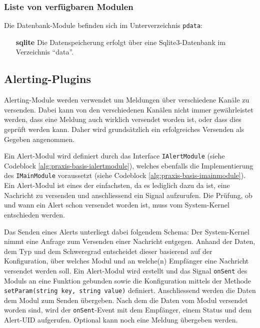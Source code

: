 \subsubsection{Liste von verf\"ugbaren Modulen} \label{sec:praxis-basis-data-list}
Die Datenbank-Module befinden sich im Unterverzeichnis \texttt{pdata}:
\begin{itemize}
 \item[\textbf{sqlite}] Die Datenspeicherung erfolgt \"uber eine Sqlite3-Datenbank im Verzeichnis "`data"'.
\end{itemize}

\subsection{Alerting-Plugins} \label{sec:praxis-basis-alert}
Alerting-Module werden verwendet um Meldungen \"uber verschiedene Kan\"ale zu versenden. Dabei kann von den verschiedenen Kan\"alen nicht immer gew\"ahrleistet werden, dass eine Meldung auch wirklich versendet worden ist, oder dass dies gepr\"uft werden kann. Daher wird grunds\"atzlich ein erfolgreiches Versenden als Gegeben angenommen.

Ein Alert-Modul wird definiert durch das Interface \texttt{IAlertModule} (siehe Codeblock \ref{alg:praxis-basis-ialertmodule}), welches ebenfalls die Implementierung des \texttt{IMainModule} voraussetzt (siehe Codeblock \ref{alg:praxis-basis-imainmodule}). Ein Alert-Modul ist eines der einfachsten, da es lediglich dazu da ist, eine Nachricht zu versenden und anschliessend ein Signal aufzurufen. Die Pr\"ufung, ob und wann ein Alert schon versendet worden ist, muss vom System-Kernel entschieden werden.

Das Senden eines Alerts unterliegt dabei folgendem Schema: Der System-Kernel nimmt eine Anfrage zum Versenden einer Nachricht entgegen. Anhand der Daten, dem Typ und dem Schweregrad entscheidet dieser basierend auf der Konfiguration, \"uber welches Modul und an welche(n) Empf\"anger eine Nachricht versendet werden soll. Ein Alert-Modul wird erstellt und das Signal \texttt{onSent} des Moduls an eine Funktion gebunden sowie die Konfiguration mittels der Methode \texttt{setParam(string key, string value)} definiert. Anschliessend werden die Daten dem Modul zum Senden \"ubergeben. Nach dem die Daten vom Modul versendet worden sind, wird der \texttt{onSent}-Event mit dem Empf\"anger, einem Status und dem Alert-UID aufgerufen. Optional kann noch eine Meldung \"ubergeben werden.

